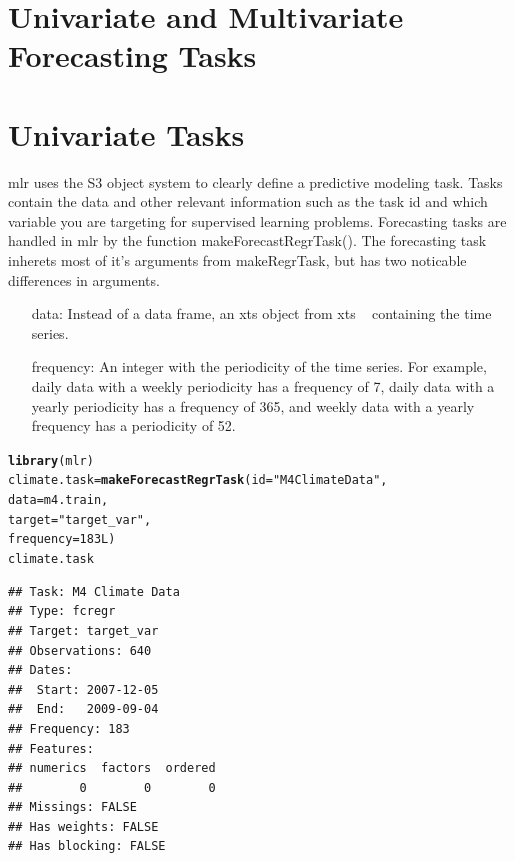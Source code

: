 \documentclass{article}\usepackage[]{graphicx}\usepackage[]{color}
\makeatletter
\newcommand{\hlnum}[1]{\textcolor[rgb]{0.686,0.059,0.569}{#1}}%
\newcommand{\hlstr}[1]{\textcolor[rgb]{0.192,0.494,0.8}{#1}}%
\newcommand{\hlstd}[1]{\textcolor[rgb]{0.345,0.345,0.345}{#1}}%
\newcommand{\hlkwb}[1]{\textcolor[rgb]{0.69,0.353,0.396}{#1}}%
\newcommand{\hlkwc}[1]{\textcolor[rgb]{0.333,0.667,0.333}{#1}}%
\newcommand{\hlkwd}[1]{\textcolor[rgb]{0.737,0.353,0.396}{\textbf{#1}}}%
\newenvironment{kframe}{%
 \def\at@end@of@kframe{}%
 \ifinner\ifhmode%
  \def\at@end@of@kframe{\end{minipage}}%
  \begin{minipage}{\columnwidth}%
 \fi\fi%
 \def\FrameCommand##1{\hskip\@totalleftmargin \hskip-\fboxsep
 \colorbox{shadecolor}{##1}\hskip-\fboxsep
     \hskip-\linewidth \hskip-\@totalleftmargin \hskip\columnwidth}%
 \MakeFramed {\advance\hsize-\width
   \@totalleftmargin\z@ \linewidth\hsize
   \@setminipage}}%
 {\par\unskip\endMakeFramed%
 \at@end@of@kframe}
\newenvironment{knitrout}{}{} %
\theoremstyle{definition}
\newcommand\code{\@codex}
\def\@codex#1{{\normalfont\ttfamily\hyphenchar\font=-1 #1}}
\newcommand{\pkg}[1]{{\fontseries{b}\selectfont #1}}
\makeatother
\begin{document}
\section{Univariate and Multivariate Forecasting Tasks}
\label{sec:task}

\section{Univariate Tasks}

\pkg{mlr} uses the S3 object system to clearly define a predictive modeling task. Tasks contain the data and other relevant information such as the task id and which variable you are targeting for supervised learning problems. Forecasting tasks are handled in \pkg{mlr} by the function \code{makeForecastRegrTask()}. The forecasting task inherets most of it's arguments from \code{makeRegrTask}, but has two noticable differences in arguments.

\begin{itemize}
\item[data:] Instead of a data frame, an xts object from \pkg{xts} ~\cite{xts} containing the time series.
\item[frequency:] An integer with the periodicity of the time series. For example, daily data with a weekly periodicity has a frequency of 7, daily data with a yearly periodicity has a frequency of 365, and weekly data with a yearly frequency has a periodicity of 52.
\end{itemize}

\begin{knitrout}
\color{fgcolor}\begin{kframe}
\begin{alltt}
\hlkwd{library}\hlstd{(mlr)}
\hlstd{climate.task} \hlkwb{=} \hlkwd{makeForecastRegrTask}\hlstd{(}\hlkwc{id} \hlstd{=} \hlstr{"M4 Climate Data"}\hlstd{,}
                                 \hlkwc{data} \hlstd{= m4.train,}
                                 \hlkwc{target} \hlstd{=} \hlstr{"target_var"}\hlstd{,}
                                 \hlkwc{frequency} \hlstd{=} \hlnum{183L}\hlstd{)}
\hlstd{climate.task}
\end{alltt}
\begin{verbatim}
## Task: M4 Climate Data
## Type: fcregr
## Target: target_var
## Observations: 640
## Dates:
##  Start: 2007-12-05 
##  End:   2009-09-04
## Frequency: 183
## Features:
## numerics  factors  ordered 
##        0        0        0 
## Missings: FALSE
## Has weights: FALSE
## Has blocking: FALSE
\end{verbatim}
\end{kframe}
\end{knitrout}
\end{document}
